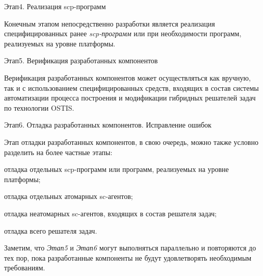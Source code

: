 \begin{SCn}
{\begin{scnitemize}
\item Этап4. Реализация scp-программ

Конечным этапом непосредственно разработки является реализация специфицированных ранее \textit{scp-программ} или при необходимости программ, реализуемых на уровне платформы.

\item Этап5. Верификация разработанных компонентов

Верификация разработанных компонентов может осуществляться как вручную, так и с использованием специфицированных средств, входящих в состав системы автоматизации процесса построения и модификации гибридных решателей задач по технологии OSTIS.

\item Этап6. Отладка разработанных компонентов. Исправление ошибок

Этап отладки разработанных компонентов, в свою очередь, можно также условно разделить на более частные этапы:

\begin{scnitemizeii}
\item отладка отдельных scp-программ или программ, реализуемых на уровне платформы;

\item отладка отдельных атомарных sc-агентов;

\item отладка неатомарных sc-агентов, входящих в состав решателя задач;

\item отладка всего решателя задач.
\end{scnitemizeii}

\end{scnitemize}

Заметим, что \textit{Этап5} и \textit{Этап6} могут выполняться параллельно и повторяются до тех пор, пока разработанные компоненты не будут удовлетворять необходимым требованиям.
}



\end{SCn}
